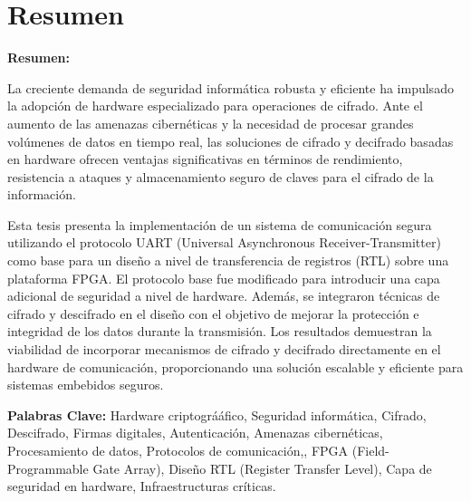 \chapter{Resumen}


\textbf{Resumen:}

La creciente demanda de seguridad inform\'atica robusta y eficiente ha impulsado la adopci\'on de hardware especializado para operaciones de cifrado. Ante el aumento de las amenazas cibern\'eticas y la necesidad de procesar grandes vol\'umenes de datos en tiempo real, las soluciones de cifrado y decifrado basadas en hardware ofrecen ventajas significativas en t\'erminos de rendimiento, resistencia a ataques y almacenamiento seguro de claves para el cifrado de la información.

Esta tesis presenta la implementaci\'on de un sistema de comunicaci\'on segura utilizando el protocolo UART (Universal Asynchronous Receiver-Transmitter) como base para un diseño a nivel de transferencia de registros (RTL) sobre una plataforma FPGA. El protocolo base fue modificado para introducir una capa adicional de seguridad a nivel de hardware. Adem\'as, se integraron t\'ecnicas de cifrado y descifrado en el diseño con el objetivo de mejorar la protecci\'on e integridad de los datos durante la transmisi\'on. Los resultados demuestran la viabilidad de incorporar mecanismos de cifrado y decifrado directamente en el hardware de comunicaci\'on, proporcionando una soluci\'on escalable y eficiente para sistemas embebidos seguros.



\textbf{Palabras Clave:} Hardware criptográ\'afico, Seguridad inform\'atica, Cifrado, Descifrado, Firmas digitales, Autenticaci\'on, Amenazas cibern\'eticas, Procesamiento de datos, Protocolos de comunicaci\'on,, FPGA (Field-Programmable Gate Array), Diseño RTL (Register Transfer Level), Capa de seguridad en hardware, Infraestructuras cr\'iticas. \\




\endinput 
